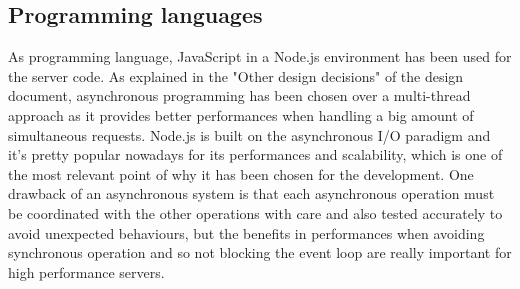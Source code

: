 \subsection{Programming languages}
As programming language, JavaScript in a Node.js environment has been used for the server code. As explained in the "Other design decisions" of the design document, asynchronous programming has been chosen over a multi-thread approach as it provides better performances when handling a big amount of simultaneous requests. Node.js is built on the asynchronous I/O paradigm and it's pretty popular nowadays for its performances and scalability, which is one of the most relevant point of why it has been chosen for the development. One drawback of an asynchronous system is that each asynchronous operation must be coordinated with the other operations with care and also tested accurately to avoid unexpected behaviours, but the benefits in performances when avoiding synchronous operation and so not blocking the event loop are really important for high performance servers.


